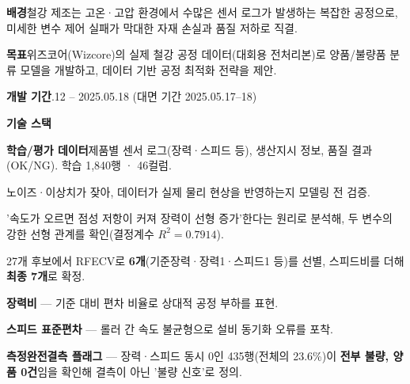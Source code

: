 

\begin{cvitems}
  \item {\textbf{배경}\enskip 철강 제조는 고온·고압 환경에서 수많은 센서 로그가 발생하는 복잡한 공정으로, 미세한 변수 제어 실패가 막대한 자재 손실과 품질 저하로 직결.}
  \item {\textbf{목표}\enskip 위즈코어(Wizcore)의 실제 철강 공정 데이터(대회용 전처리본)로 양품/불량품 분류 모델을 개발하고, 데이터 기반 공정 최적화 전략을 제안.}
  \item {\textbf{개발 기간}.12 -- 2025.05.18 (대면 기간 2025.05.17--18)}
  \item {\textbf{기술 스택}\enskip {}     }
\end{cvitems}

\begin{cvitems}
  \item {\textbf{학습/평가 데이터}\enskip 제품별 센서 로그(장력·스피드 등), 생산지시 정보, 품질 결과(OK/NG). 학습 1,840행 · 46컬럼.}
\end{cvitems}


\begin{substeps}
  \item 노이즈·이상치가 잦아, 데이터가 실제 물리 현상을 반영하는지 모델링 전 검증.
  \item '속도가 오르면 점성 저항이 커져 장력이 선형 증가'한다는 원리로 분석해, 두 변수의 강한 선형 관계를 확인(결정계수 $R^2=0.7914$).
\end{substeps}

\begin{substeps}
  \item 27개 후보에서 RFECV로 \textbf{6개}(기준장력·장력1·스피드1 등)를 선별, 스피드비를 더해 \textbf{최종 7개}로 확정.
  \item \textbf{장력비} --- 기준 대비 편차 비율로 상대적 공정 부하를 표현.
  \item \textbf{스피드 표준편차} --- 롤러 간 속도 불균형으로 설비 동기화 오류를 포착.
  \item \textbf{측정완전결측 플래그} --- 장력·스피드 동시 0인 435행(전체의 23.6\%)이 \textbf{전부 불량, 양품 0건}임을 확인해 결측이 아닌 '불량 신호'로 정의.
\end{substeps}

